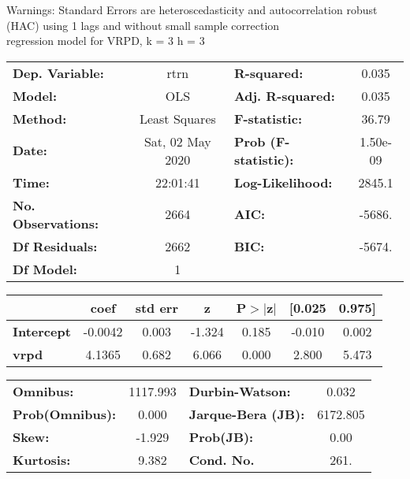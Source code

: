 Warnings: \newline
 [1] Standard Errors are heteroscedasticity and autocorrelation robust (HAC) using 1 lags and without small sample correction\\ 

regression model for VRPD, k = 3 h = 3\begin{center}
\begin{tabular}{lclc}
\toprule
\textbf{Dep. Variable:}    &       rtrn       & \textbf{  R-squared:         } &     0.035   \\
\textbf{Model:}            &       OLS        & \textbf{  Adj. R-squared:    } &     0.035   \\
\textbf{Method:}           &  Least Squares   & \textbf{  F-statistic:       } &     36.79   \\
\textbf{Date:}             & Sat, 02 May 2020 & \textbf{  Prob (F-statistic):} &  1.50e-09   \\
\textbf{Time:}             &     22:01:41     & \textbf{  Log-Likelihood:    } &    2845.1   \\
\textbf{No. Observations:} &        2664      & \textbf{  AIC:               } &    -5686.   \\
\textbf{Df Residuals:}     &        2662      & \textbf{  BIC:               } &    -5674.   \\
\textbf{Df Model:}         &           1      & \textbf{                     } &             \\
\bottomrule
\end{tabular}
\begin{tabular}{lcccccc}
                   & \textbf{coef} & \textbf{std err} & \textbf{z} & \textbf{P$> |$z$|$} & \textbf{[0.025} & \textbf{0.975]}  \\
\midrule
\textbf{Intercept} &      -0.0042  &        0.003     &    -1.324  &         0.185        &       -0.010    &        0.002     \\
\textbf{vrpd}      &       4.1365  &        0.682     &     6.066  &         0.000        &        2.800    &        5.473     \\
\bottomrule
\end{tabular}
\begin{tabular}{lclc}
\textbf{Omnibus:}       & 1117.993 & \textbf{  Durbin-Watson:     } &    0.032  \\
\textbf{Prob(Omnibus):} &   0.000  & \textbf{  Jarque-Bera (JB):  } & 6172.805  \\
\textbf{Skew:}          &  -1.929  & \textbf{  Prob(JB):          } &     0.00  \\
\textbf{Kurtosis:}      &   9.382  & \textbf{  Cond. No.          } &     261.  \\
\bottomrule
\end{tabular}
\end{center}

